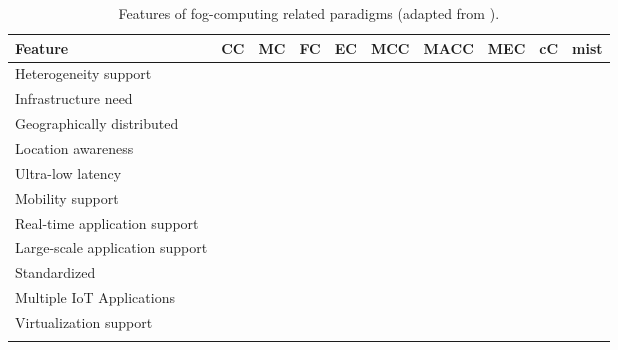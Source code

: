 \begin{table}[!t]
	\scriptsize
	\begin{tabular*}{\textwidth}{l >{\centering\arraybackslash}m{0.4in} >{\centering\arraybackslash}m{0.4in} >{\centering\arraybackslash}m{0.4in} >{\centering\arraybackslash}m{0.4in} >{\centering\arraybackslash}m{0.4in} >{\centering\arraybackslash}m{0.4in} >{\centering\arraybackslash}m{0.4in} >{\centering\arraybackslash}m{0.4in} >{\centering\arraybackslash}m{0.4in}}
		\toprule
		\centering\textbf{Feature} & \textbf{CC} & \textbf{MC} & \textbf{FC} & \textbf{EC} & \textbf{MCC} & \textbf{MACC} & \textbf{MEC} & \textbf{cC} & \textbf{mist} \\[2pt]
		\toprule
		Heterogeneity support & \cmark &  & \cmark & \cmark & \cmark &  &  &  & \cmark \\ \midrule
		Infrastructure need & \cmark &  & \cmark & \cmark & \cmark &  & \cmark & \cmark & \cmark \\ \midrule
		Geographically distributed &  &  & \cmark & \cmark &  &  & \cmark & \cmark & \cmark \\ \midrule
		Location awareness &  & \cmark & \cmark & \cmark &  & \cmark & \cmark & \cmark & \cmark \\ \midrule
		Ultra-low latency &  &  & \cmark & \cmark &  &  & \cmark & \cmark & \cmark \\ \midrule
		Mobility support &  & \cmark & \cmark & \cmark & \cmark & \cmark & \cmark & \cmark & \cmark \\ \midrule
		Real-time application support &  &  & \cmark & \cmark &  &  & \cmark & \cmark & \cmark \\ \midrule
		Large-scale application support & \cmark &  & \cmark & \cmark &  &  & \cmark &  & \cmark \\ \midrule
		Standardized & \cmark & \cmark & \cmark & \cmark &  &  & \cmark &  &  \\ \midrule
		Multiple IoT Applications & \cmark &  & \cmark &  &  &  &  & \cmark & \cmark \\ \midrule
		Virtualization support & \cmark &  & \cmark &  &  &  & \cmark & \cmark &  \\ \bottomrule \\
	\end{tabular*}
	\caption{Features of fog-computing related paradigms (adapted from \cite{yousefpour2018all}).}
	\label{computing_paradigms}
	\vspace{-5mm}
\end{table}